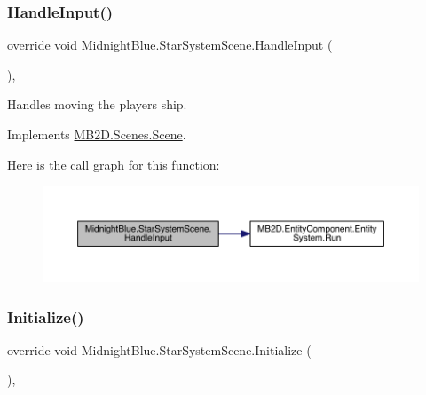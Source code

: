 \subsubsection{\texorpdfstring{Handle\+Input()}{HandleInput()}}
{\footnotesize\ttfamily override void Midnight\+Blue.\+Star\+System\+Scene.\+Handle\+Input (\begin{DoxyParamCaption}{ }\end{DoxyParamCaption})\hspace{0.3cm}{\ttfamily [inline]}, {\ttfamily [virtual]}}



Handles moving the players ship. 



Implements \hyperlink{class_m_b2_d_1_1_scenes_1_1_scene_a476de5a885408d27ff151044d20738c8}{M\+B2\+D.\+Scenes.\+Scene}.

Here is the call graph for this function\+:
\nopagebreak
\begin{figure}[H]
\begin{center}
\leavevmode
\includegraphics[width=350pt]{class_midnight_blue_1_1_star_system_scene_a9fd64901322082a4da8658650257163d_cgraph}
\end{center}
\end{figure}
\hypertarget{class_midnight_blue_1_1_star_system_scene_a1b593cd45d0f1b6c02f17ec5dd1033ca}{}\label{class_midnight_blue_1_1_star_system_scene_a1b593cd45d0f1b6c02f17ec5dd1033ca} 
\subsubsection{\texorpdfstring{Initialize()}{Initialize()}}
{\footnotesize\ttfamily override void Midnight\+Blue.\+Star\+System\+Scene.\+Initialize (\begin{DoxyParamCaption}{ }\end{DoxyParamCaption})\hspace{0.3cm}{\ttfamily [inline]}, {\ttfamily [virtual]}}




